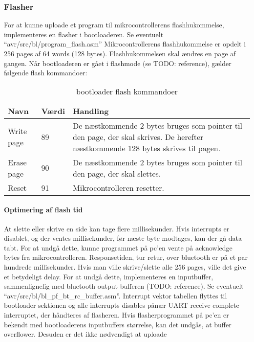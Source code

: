 \subsubsection{Flasher}
For at kunne uploade et program til mikrocontrollerens flashhukommelse, implementeres en flasher i bootloaderen.
Se eventuelt \mbox{``avr/src/bl/program\_flash.asm''}
Mikrocontrollerens flashhukommelse er opdelt i 256 pages af 64 words (128 bytes). Flashhukommelsen skal ændres en page af gangen.
Når bootloaderen er gået i flashmode (se TODO: reference), gælder følgende flash kommandoer:
\begin{table}[H]
	\caption{bootloader flash kommandoer}
	\label{tab:blflashcommands}
	\centering
	\begin{tabular}{|l|l|p{13cm}|}
		\hline
		\textbf{Navn} & \textbf{Værdi} & \textbf{Handling} \\
		\hline
		Write page & 89 & De næstkommende 2 bytes bruges som pointer til den page, der skal skrives. De herefter næstkommende 128 bytes skrives til pagen.\\
		\hline
		Erase page & 90 & De næstkommende 2 bytes bruges som pointer til den page, der skal slettes.\\
		\hline
		Reset & 91 & Mikrocontrolleren resetter.\\
		\hline
	\end{tabular}
\end{table}
\paragraph{Optimering af flash tid}
At slette eller skrive en side kan tage flere millisekunder. Hvis interrupts er disablet, og der ventes millisekunder, før næste byte modtages, kan der gå data tabt. For at undgå dette, kunne programmet på pc'en vente på acknowledge bytes fra mikrocontrolleren. Responsetiden, tur retur, over bluetooth er på et par hundrede millisekunder. Hvis man ville skrive/slette alle 256 pages, ville det give et betydeligt delay.
For at undgå dette, implementeres en inputbuffer, sammenlignelig med bluetooth output bufferen (TODO: reference). Se eventuelt \mbox{``avr/src/bl/bl\_pf\_bt\_rc\_buffer.asm''}. Interrupt vektor tabellen flyttes til bootloader sektionen og alle interrupts disables pånær UART receive complete interruptet, der håndteres af flasheren. Hvis flasherprogrammet på pc'en er bekendt med bootloaderens inputbuffers størrelse, kan det undgås, at buffer overflower. Desuden er det ikke nødvendigt at uploade
